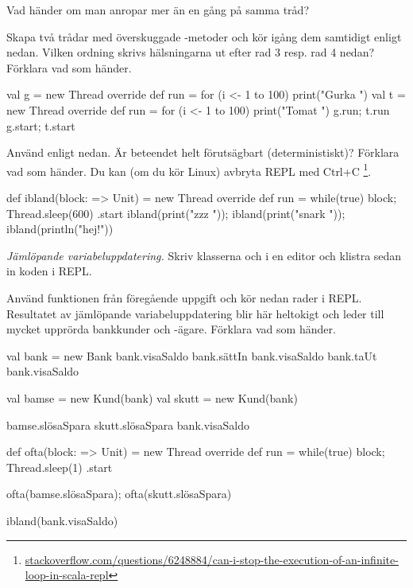 \Subtask Vad händer om man anropar  mer än en gång på samma tråd?

\Subtask Skapa två trådar med överskuggade -metoder och kör igång dem samtidigt enligt nedan. Vilken ordning skrivs hälsningarna ut efter rad 3 resp. rad 4 nedan? Förklara vad som händer.
\begin{REPL}
val g = new Thread{ override def run = for (i <- 1 to 100) print("Gurka ") }
val t = new Thread{ override def run = for (i <- 1 to 100) print("Tomat ") }
g.run; t.run
g.start; t.start
\end{REPL}

\Subtask Använd  enligt nedan. Är beteendet helt förutsägbart (deterministiskt)? Förklara vad som händer. Du kan (om du kör Linux) avbryta REPL med Ctrl+C%
\footnote{\href{http://stackoverflow.com/questions/6248884/can-i-stop-the-execution-of-an-infinite-loop-in-scala-repl}{stackoverflow.com/questions/6248884/can-i-stop-the-execution-of-an-infinite-loop-in-scala-repl}}.
\begin{REPL}
def ibland(block: => Unit) = new Thread {
  override def run = while(true) { block; Thread.sleep(600) }
}.start
ibland(print("zzz ")); ibland(print("snark ")); ibland(println("hej!")) 
\end{REPL}


\Task \label{task:racecondition} \emph{Jämlöpande variabeluppdatering.} Skriv klasserna  och  i en editor och klistra sedan in koden i REPL.


\Subtask Använd funktionen  från föregående uppgift och kör nedan rader i REPL. Resultatet av jämlöpande variabeluppdatering blir här heltokigt och leder till mycket upprörda bankkunder och -ägare. Förklara vad som händer.

\begin{REPL}
val bank = new Bank
bank.visaSaldo
bank.sättIn
bank.visaSaldo
bank.taUt
bank.visaSaldo

val bamse = new Kund(bank)
val skutt = new Kund(bank)

bamse.slösaSpara
skutt.slösaSpara
bank.visaSaldo

def ofta(block: => Unit) = new Thread {
  override def run = while(true) { block; Thread.sleep(1) }
}.start

ofta(bamse.slösaSpara); ofta(skutt.slösaSpara)

ibland(bank.visaSaldo)
\end{REPL}


